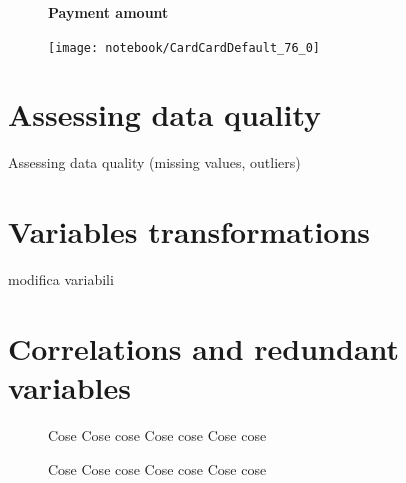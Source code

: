 \documentclass[11pt,a4paper]{report}
\begin{document}
\smallskip
\begin{figure}[h]
  \begin{minipage}[h]{.40\textwidth}
        {\Large \textbf{Payment amount}}
        

  \end{minipage}
  \begin{minipage}[h]{.60\textwidth}
    \texttt{[image: notebook/CardCardDefault\_76\_0]}
  \end{minipage}
\end{figure}


\clearpage

\section{Assessing data quality}

Assessing data quality (missing values, outliers)

\section{Variables transformations}

modifica variabili

\section{Correlations and redundant variables}

\begin{figure}[h]
  \begin{minipage}[h]{.40\textwidth}
        Cose Cose cose Cose cose Cose cose
  \end{minipage}
  \begin{minipage}[h]{.60\textwidth}
  \end{minipage}
\end{figure}


\begin{figure}[h]
  \begin{minipage}[h]{.60\textwidth}
  \end{minipage}
  \begin{minipage}[h]{.40\textwidth}
        Cose Cose cose Cose cose Cose cose
  \end{minipage}
\end{figure}
\clearpage
\end{document}

